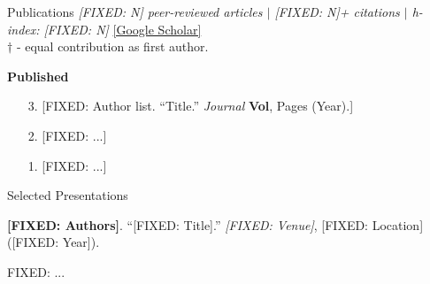 \documentclass{cv}
\begin{document}
\begin{rSection}{Publications}
\textit{[FIXED: N] peer-reviewed articles $|$ [FIXED: N]+ citations $|$ h-index: [FIXED: N]} \hfill \href{[CONFIG: Google Scholar URL]}{[Google Scholar]}\\
\vspace{0.07cm}
$\dagger$ - equal contribution as first author.
\vspace{0.15cm}

\textbf{Published}
\begin{enumerate}[leftmargin=1.5em, labelsep=0.5em, itemsep=0.1em]
\item[3.] [FIXED: Author list. ``Title.'' \textit{Journal} \textbf{Vol}, Pages (Year).]
\item[2.] [FIXED: ...]
\item[1.] [FIXED: ...]
\end{enumerate}

\end{rSection}


\begin{rSection2}{Selected Presentations}
\item \textbf{[FIXED: Authors]}. ``[FIXED: Title].'' \textit{[FIXED: Venue]}, [FIXED: Location] ([FIXED: Year]).
\item [FIXED: ...]
\end{rSection2}

\end{document}
